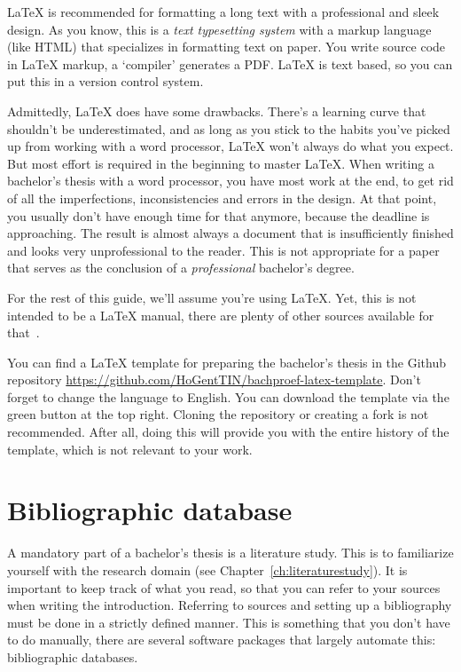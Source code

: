 {\LaTeX} is recommended for formatting a long text with a professional and sleek design. As you know, this is a \emph{text typesetting system} with a markup language (like HTML) that specializes in formatting text on paper. You write source code in {\LaTeX} markup, a `compiler' generates a PDF. {\LaTeX} is text based, so you can put this in a version control system.

Admittedly, {\LaTeX} does have some drawbacks. There's a learning curve that shouldn't be underestimated, and as long as you stick to the habits you've picked up from working with a word processor, {\LaTeX} won't always do what you expect. But most effort is required in the beginning to master {\LaTeX}. When writing a bachelor's thesis with a word processor, you have most work at the end, to get rid of all the imperfections, inconsistencies and errors in the design. At that point, you usually don't have enough time for that anymore, because the deadline is approaching. The result is almost always a document that is insufficiently finished and looks very unprofessional to the reader. This is not appropriate for a paper that serves as the conclusion of a \textit{professional} bachelor's degree.

For the rest of this guide, we'll assume you're using {\LaTeX}. Yet, this is not intended to be a {\LaTeX} manual, there are plenty of other sources available for that~\parencite{Oetiker2015}.

You can find a {\LaTeX} template for preparing the bachelor's thesis in the Github repository \url{https://github.com/HoGentTIN/bachproef-latex-template}. Don't forget to change the language to English. You can download the template via the green button at the top right. Cloning the repository or creating a fork is not recommended. After all, doing this will provide you with the entire history of the template, which is not relevant to your work.


\section{Bibliographic database}
\label{sec:bibliografic-database}

A mandatory part of a bachelor's thesis is a literature study. This is to familiarize yourself with the research domain (see Chapter~\ref{ch:literaturestudy}). It is important to keep track of what you read, so that you can refer to your sources when writing the introduction. Referring to sources and setting up a bibliography must be done in a strictly defined manner. This is something that you don't have to do manually, there are several software packages that largely automate this: bibliographic databases.

